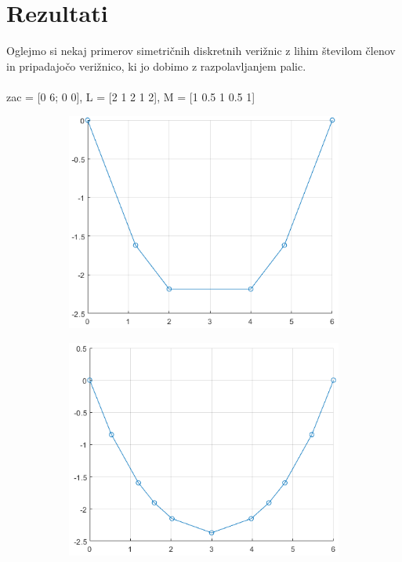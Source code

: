 \documentclass[A4paper, 11pt]{article}
\begin{document}
\section{Rezultati} 
Oglejmo si nekaj primerov simetričnih diskretnih verižnic z lihim številom členov in pripadajočo verižnico, ki jo dobimo z razpolavljanjem palic. \\
\\
zac = [0 6; 0 0], \quad L = [2 1 2 1 2], \quad M = [1 0.5 1 0.5 1]
\begin{figure}[h]
\begin{subfigure}{.5\textwidth}
\includegraphics[scale=0.5]{simetricna_liha}
\end{subfigure}
\begin{subfigure}{.5\textwidth}
\includegraphics[scale=0.5]{prepolovljena}
\end{subfigure}
\end{figure}
\end{document}
